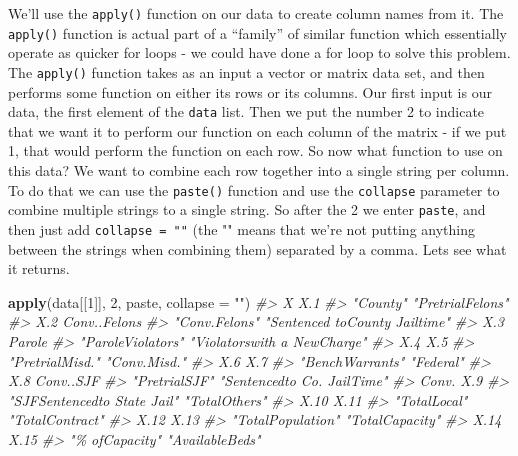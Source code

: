 \documentclass[
  12pt,
]{book}
\newenvironment{Shaded}{\begin{snugshade}}{\end{snugshade}}
\newcommand{\CommentTok}[1]{\textcolor[rgb]{0.56,0.35,0.01}{\textit{#1}}}
\newcommand{\DataTypeTok}[1]{\textcolor[rgb]{0.13,0.29,0.53}{#1}}
\newcommand{\DecValTok}[1]{\textcolor[rgb]{0.00,0.00,0.81}{#1}}
\newcommand{\KeywordTok}[1]{\textcolor[rgb]{0.13,0.29,0.53}{\textbf{#1}}}
\newcommand{\NormalTok}[1]{#1}
\newcommand{\StringTok}[1]{\textcolor[rgb]{0.31,0.60,0.02}{#1}}
\begin{document}
We'll use the \texttt{apply()} function on our data to create column names from it. The \texttt{apply()} function is actual part of a ``family'' of similar function which essentially operate as quicker for loops - we could have done a for loop to solve this problem. The \texttt{apply()} function takes as an input a vector or matrix data set, and then performs some function on either its rows or its columns. Our first input is our data, the first element of the \texttt{data} list. Then we put the number 2 to indicate that we want it to perform our function on each column of the matrix - if we put 1, that would perform the function on each row. So now what function to use on this data? We want to combine each row together into a single string per column. To do that we can use the \texttt{paste()} function and use the \texttt{collapse} parameter to combine multiple strings to a single string. So after the 2 we enter \texttt{paste}, and then just add \texttt{collapse\ =\ ""} (the "" means that we're not putting anything between the strings when combining them) separated by a comma. Lets see what it returns.

\begin{Shaded}
\begin{Highlighting}[]
\KeywordTok{apply}\NormalTok{(data[[}\DecValTok{1}\NormalTok{]], }\DecValTok{2}\NormalTok{, paste, }\DataTypeTok{collapse =} \StringTok{""}\NormalTok{)}
\CommentTok{\#>                             X                           X.1 }
\CommentTok{\#>                      "County"              "PretrialFelons" }
\CommentTok{\#>                           X.2                  Conv..Felons }
\CommentTok{\#>                 "Conv.Felons" "Sentenced toCounty Jailtime" }
\CommentTok{\#>                           X.3                        Parole }
\CommentTok{\#>             "ParoleViolators"   "Violatorswith a NewCharge" }
\CommentTok{\#>                           X.4                           X.5 }
\CommentTok{\#>               "PretrialMisd."                  "Conv.Misd." }
\CommentTok{\#>                           X.6                           X.7 }
\CommentTok{\#>               "BenchWarrants"                     "Federal" }
\CommentTok{\#>                           X.8                     Conv..SJF }
\CommentTok{\#>                 "PretrialSJF"    "Sentencedto Co. JailTime" }
\CommentTok{\#>                         Conv.                           X.9 }
\CommentTok{\#>   "SJFSentencedto State Jail"                 "TotalOthers" }
\CommentTok{\#>                          X.10                          X.11 }
\CommentTok{\#>                  "TotalLocal"               "TotalContract" }
\CommentTok{\#>                          X.12                          X.13 }
\CommentTok{\#>             "TotalPopulation"               "TotalCapacity" }
\CommentTok{\#>                          X.14                          X.15 }
\CommentTok{\#>                "\% ofCapacity"               "AvailableBeds"}
\end{Highlighting}
\end{Shaded}
\end{document}
